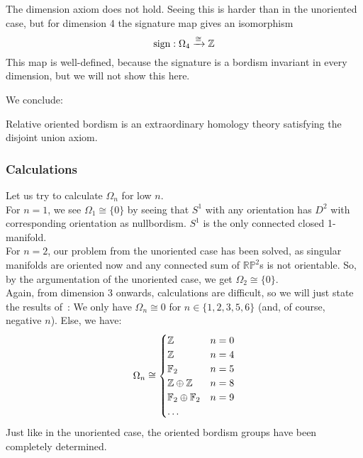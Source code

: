 \documentclass[a4paper,11pt]{article}
\begin{document}

\begin{remark}
    The dimension axiom does not hold. Seeing this is harder than in the unoriented case, but for dimension 4 the signature map gives an isomorphism
    \[\mathrm{sign}:\Omega_4\xrightarrow{\cong}\mathbb{Z}\]
    This map is well-defined, because the signature is a bordism invariant in every dimension, but we will not show this here.
\end{remark}

We conclude:
\begin{theorem}
    Relative oriented bordism is an extraordinary homology theory satisfying the disjoint union axiom.
\end{theorem}

\subsubsection{Calculations}

Let us try to calculate \(\Omega_n\) for low \(n\).\\
For \(n=1\), we see \(\Omega_1\cong\{0\}\) by seeing that \(S^1\) with any orientation has \(D^2\) with corresponding orientation as nullbordism. \(S^1\) is the only connected closed 1-manifold.\\
For \(n=2\), our problem from the unoriented case has been solved, as singular manifolds are oriented now and any connected sum of \(\mathbb{RP}^2\)s is not orientable. 
So, by the argumentation of the unoriented case, we get \(\Omega_2\cong\{0\}\).\\
Again, from dimension 3 onwards, calculations are difficult, so we will just state the results of\ \cite[\S 17]{stasheff}: We only have \(\Omega_n\cong 0\) for \(n\in\{1,2,3,5,6\}\) (and, of course, negative \(n\)). Else, we have:
\[\Omega_n\cong\begin{cases}\mathbb{Z} & n=0\\
\mathbb{Z} & n=4\\
\mathbb{F}_2 & n=5\\
\mathbb{Z}\oplus\mathbb{Z} & n=8\\
\mathbb{F}_2\oplus\mathbb{F}_2 & n=9\\
\dots
\end{cases}\]
Just like in the unoriented case, the oriented bordism groups have been completely determined.
\end{document}
